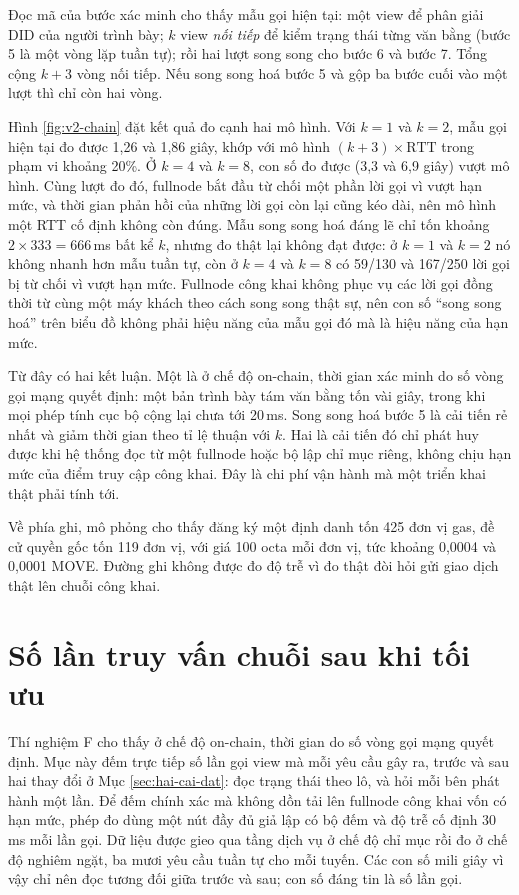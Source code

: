 Đọc mã của bước xác minh cho thấy mẫu gọi hiện tại: một view để phân giải DID của người trình bày; $k$ view \emph{nối tiếp} để kiểm trạng thái từng văn bằng (bước 5 là một vòng lặp tuần tự); rồi hai lượt song song cho bước 6 và bước 7. Tổng cộng $k + 3$ vòng nối tiếp. Nếu song song hoá bước 5 và gộp ba bước cuối vào một lượt thì chỉ còn hai vòng.



Hình \ref{fig:v2-chain} đặt kết quả đo cạnh hai mô hình. Với $k = 1$ và $k = 2$, mẫu gọi hiện tại đo được 1,26 và 1,86 giây, khớp với mô hình $(k+3) \times \mathrm{RTT}$ trong phạm vi khoảng 20\%. Ở $k = 4$ và $k = 8$, con số đo được (3,3 và 6,9 giây) vượt mô hình. Cùng lượt đo đó, fullnode bắt đầu từ chối một phần lời gọi vì vượt hạn mức, và thời gian phản hồi của những lời gọi còn lại cũng kéo dài, nên mô hình một RTT cố định không còn đúng. Mẫu song song hoá đáng lẽ chỉ tốn khoảng $2 \times 333 = 666$\,ms bất kể $k$, nhưng đo thật lại không đạt được: ở $k = 1$ và $k = 2$ nó không nhanh hơn mẫu tuần tự, còn ở $k = 4$ và $k = 8$ có 59/130 và 167/250 lời gọi bị từ chối vì vượt hạn mức. Fullnode công khai không phục vụ các lời gọi đồng thời từ cùng một máy khách theo cách song song thật sự, nên con số ``song song hoá'' trên biểu đồ không phải hiệu năng của mẫu gọi đó mà là hiệu năng của hạn mức.

Từ đây có hai kết luận. Một là ở chế độ on-chain, thời gian xác minh do số vòng gọi mạng quyết định: một bản trình bày tám văn bằng tốn vài giây, trong khi mọi phép tính cục bộ cộng lại chưa tới 20\,ms. Song song hoá bước 5 là cải tiến rẻ nhất và giảm thời gian theo tỉ lệ thuận với $k$. Hai là cải tiến đó chỉ phát huy được khi hệ thống đọc từ một fullnode hoặc bộ lập chỉ mục riêng, không chịu hạn mức của điểm truy cập công khai. Đây là chi phí vận hành mà một triển khai thật phải tính tới.

Về phía ghi, mô phỏng cho thấy đăng ký một định danh tốn 425 đơn vị gas, đề cử quyền gốc tốn 119 đơn vị, với giá 100 octa mỗi đơn vị, tức khoảng 0,0004 và 0,0001 MOVE. Đường ghi không được đo độ trễ vì đo thật đòi hỏi gửi giao dịch thật lên chuỗi công khai.

\section{Số lần truy vấn chuỗi sau khi tối ưu}
\label{sec:truy-van-chuoi}

Thí nghiệm F cho thấy ở chế độ on-chain, thời gian do số vòng gọi mạng quyết định. Mục này đếm trực tiếp số lần gọi view mà mỗi yêu cầu gây ra, trước và sau hai thay đổi ở Mục \ref{sec:hai-cai-dat}: đọc trạng thái theo lô, và hỏi mỗi bên phát hành một lần. Để đếm chính xác mà không dồn tải lên fullnode công khai vốn có hạn mức, phép đo dùng một nút đầy đủ giả lập có bộ đếm và độ trễ cố định 30\,ms mỗi lần gọi. Dữ liệu được gieo qua tầng dịch vụ ở chế độ chỉ mục rồi đo ở chế độ nghiêm ngặt, ba mươi yêu cầu tuần tự cho mỗi tuyến. Các con số mili giây vì vậy chỉ nên đọc tương đối giữa trước và sau; con số đáng tin là số lần gọi.

